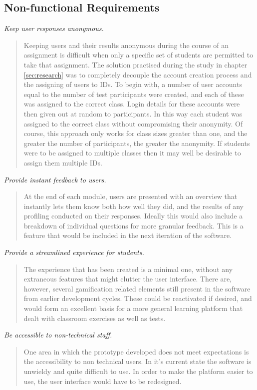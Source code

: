 \documentclass[12pt,a4paper,twoside]{report}
\begin{document}
\subsection{Non-functional Requirements}
\textit{Keep user responses anonymous.}
\begin{quote}
	Keeping users and their results anonymous during the course of an assignment is difficult when only a specific set of students are permitted to take that assignment. The solution practised during the study in chapter \ref{sec:research} was to completely decouple the account creation process and the assigning of users to IDs. To begin with, a number of user accounts equal to the number of test participants were created, and each of these was assigned to the correct class. Login details for these accounts were then given out at random to participants. In this way each student was assigned to the correct class without compromising their anonymity. Of course, this approach only works for class sizes greater than one, and the greater the number of participants, the greater the anonymity. If students were to be assigned to multiple classes then it may well be desirable to assign them multiple IDs.
\end{quote}
\textit{Provide instant feedback to users.}
\begin{quote}
	At the end of each module, users are presented with an overview that instantly lets them know both how well they did, and the results of any profiling conducted on their responses. Ideally this would also include a breakdown of individual questions for more granular feedback. This is a feature that would be included in the next iteration of the software.
\end{quote}
\textit{Provide a streamlined experience for students.}
\begin{quote}
	The experience that has been created is a minimal one, without any extraneous features that might clutter the user interface. There are, however, several gamification related elements still present in the software from earlier development cycles. These could be reactivated if desired, and would form an excellent basis for a more general learning platform that dealt with classroom exercises as well as tests.
\end{quote}
\textit{Be accessible to non-technical staff.}
\begin{quote}
	One area in which the prototype developed does not meet expectations is the accessibility to non technical users. In it's current state the software is unwieldy and quite difficult to use. In order to make the platform easier to use, the user interface would have to be redesigned.
\end{quote}
\end{document}
